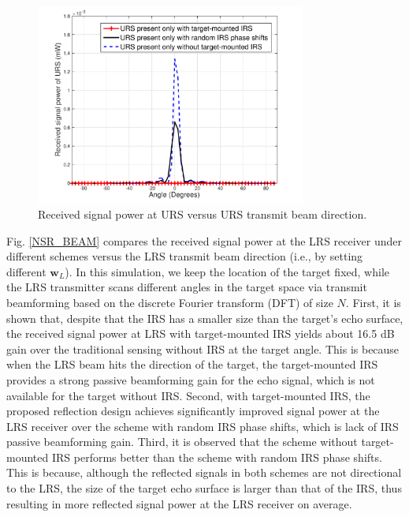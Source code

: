 \documentclass[10pt,final,doublecolumn]{IEEEtran}
\begin{document}
\begin{figure}[t]
\centering
\setlength{\abovecaptionskip}{0.cm}
\includegraphics[width=3.5in]{URS_only.pdf}
\caption{Received signal power at URS versus URS transmit beam direction.}
\label{URS_only}
\end{figure}

Fig. \ref{NSR_BEAM} compares the received signal power at the LRS receiver under different schemes versus the LRS transmit beam direction (i.e., by setting different $\mathbf{w}_L$). In this
simulation, we keep the location of the target
fixed, while the LRS transmitter scans different angles in the target
space via transmit beamforming based on the discrete
Fourier transform (DFT) of size $N$. First, it is shown that, despite that the IRS has a smaller size than the target's echo surface, the
received signal power at LRS with
target-mounted IRS yields about 16.5 dB gain over
the traditional sensing without IRS at the target
angle. This is because when the LRS beam
hits the direction of the target, the target-mounted IRS
provides a strong passive beamforming gain for
the echo signal, which is not available for the target
without IRS. Second, with target-mounted IRS, the proposed reflection design  achieves significantly improved signal power at the LRS receiver over the scheme with random IRS phase shifts, which is lack of IRS
passive beamforming gain. Third, it is observed that the scheme without target-mounted IRS performs better than the scheme with random IRS phase shifts. This is because, although the reflected signals in both schemes are not directional to the LRS, the size of the target echo surface is larger than that of the IRS, thus resulting in more reflected signal power at the LRS receiver on average.
\end{document}
